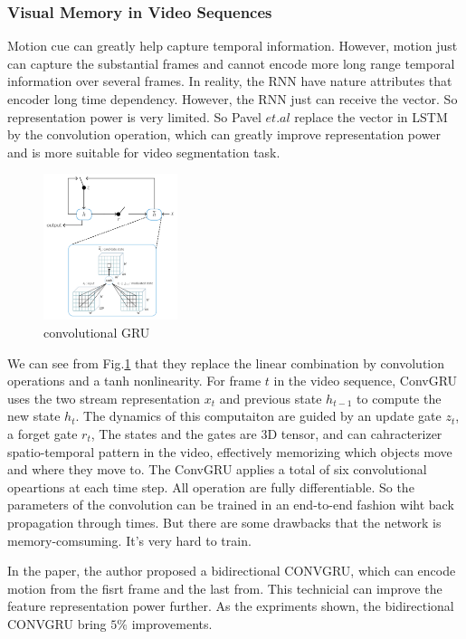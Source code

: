\subsubsection{Visual Memory in Video Sequences}
Motion cue can greatly help capture temporal information. However, motion just can capture the substantial frames and cannot encode more long range
temporal information over several frames. In reality, the RNN have nature attributes that encoder long time dependency. However, the RNN just can 
receive the vector. So representation power is very limited. So Pavel $et.al$\cite{Tokmakov2017Learning} replace the vector in LSTM by the convolution 
operation, which can greatly improve representation power and is more suitable for video segmentation task.
\begin{figure}[ht]
    \centering
    \includegraphics[width=0.35\textwidth]{figure/LVO_CONVRRU.png}
    \caption{convolutional GRU}
    \label{CONVGRU}
\end{figure}

We can see from Fig.\ref{CONVGRU} that they replace the linear combination by convolution operations and a tanh nonlinearity. For frame $t$ in the video
sequence, ConvGRU uses the two stream representation $x_t$ and previous state $h_{t-1}$ to compute the new state $h_t$. The dynamics of this computaiton 
are guided by an update gate $z_t$, a forget gate $r_t$, The states  and the gates are $3$D tensor, and can cahracterizer spatio-temporal pattern in
the video, effectively memorizing which objects move and where they move to. The ConvGRU applies a total of six convolutional opeartions at each time step.
All operation are fully differentiable. So the parameters of the convolution can be trained in an end-to-end fashion wiht back propagation through times.
But there are some drawbacks that the network is memory-comsuming. It's very hard to train. 

In the paper, the author proposed a bidirectional CONVGRU, which can encode motion from the fisrt frame and the last from. This technicial can improve the feature
representation power further. As the expriments shown, the bidirectional CONVGRU bring $5\%$ improvements.

